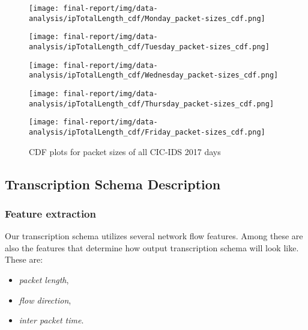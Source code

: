 \documentclass{article}
\begin{document}
\begin{figure}[tbp!]
  \centering
  \begin{minipage}[b]{0.49\textwidth}
    \texttt{[image: final-report/img/data-analysis/ipTotalLength\_cdf/Monday\_packet-sizes\_cdf.png]}
  \end{minipage}
  \hfill
  \begin{minipage}[b]{0.49\textwidth}
    \texttt{[image: final-report/img/data-analysis/ipTotalLength\_cdf/Tuesday\_packet-sizes\_cdf.png]}
  \end{minipage}
  \vfill
  \begin{minipage}[b]{0.49\textwidth}
    \texttt{[image: final-report/img/data-analysis/ipTotalLength\_cdf/Wednesday\_packet-sizes\_cdf.png]}
  \end{minipage}
  \hfill
  \begin{minipage}[b]{0.49\textwidth}
    \texttt{[image: final-report/img/data-analysis/ipTotalLength\_cdf/Thursday\_packet-sizes\_cdf.png]}
  \end{minipage}

  \vfill

  \begin{minipage}[b]{0.49\textwidth}
    \texttt{[image: final-report/img/data-analysis/ipTotalLength\_cdf/Friday\_packet-sizes\_cdf.png]}
  \end{minipage}

  \caption{CDF plots for packet sizes of all CIC-IDS 2017 days}
  \label{fig-cdf-packet-sizes}
\end{figure}



\subsection{Transcription Schema Description}\label{sec-schema}

\subsubsection{Feature extraction}

Our transcription schema utilizes several network flow features. Among these are also the features that determine how output transcription schema will look like. These are:

\begin{itemize}
    \item \textit{packet length},
    \item \textit{flow direction},
    \item \textit{inter packet time}.
\end{itemize}
\end{document}
